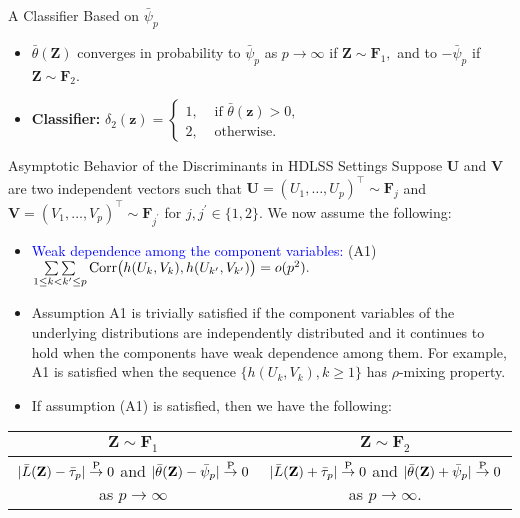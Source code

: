 \documentclass[aspectratio=169, 14pt]{beamer}
\newlength{\colwidth}
\newcommand{\bZ}{\mathbf{Z}}
\newcommand{\bF}{\mathbf{F}}
\newcommand{\bU}{\mathbf{U}}
\newcommand{\bV}{\mathbf{V}}
\newcommand{\bz}{\mathbf{z}}
\newcommand{\0}{\mathbf{0}}
\newcommand{\1}{\mathbf{1}}
\begin{document}
\begin{frame}[t]
\begin{columns}[t]
\begin{column}{\colwidth}
\begin{block}{A Classifier Based on $\bar{\psi}_p$}
\begin{itemize}
\item $\bar{\theta}(\bZ)$ converges in probability to $\bar{\psi}_p$ as $p\to\infty$ if $\bZ\sim\bF_1,$ and to $-\bar{\psi}_p$ if $\bZ\sim\bF_2$.
\item {\bf Classifier:} $\delta_2(\bz)=\begin{cases}
                1,& \text{ if }\bar{\theta}(\bz)>0,\\
                2,& \text{ otherwise.}
               \end{cases}$
\end{itemize}
  \end{block}
\begin{block}{Asymptotic Behavior of the Discriminants in HDLSS Settings}
Suppose $\bU$ and $\bV$ are two independent vectors such that $\bU=(U_1,\ldots, U_p)^\top\sim \bF_j$ and $\bV=(V_1,\ldots, V_p)^\top\sim \bF_{j^\prime}$ for $j,j^\prime\in\{1,2\}$.  We now assume the following:
\begin{itemize}
 \item \textcolor{blue}{Weak dependence among the component variables:} (A1) $\mathop{\sum\sum}\limits_{1\leq k<k^\prime\leq p} {\rm Corr}\big(h(U_k,V_k),h(U_{k^\prime},V_{k^\prime})\big)=o(p^2).$
\item Assumption A1 is trivially satisfied if the component variables of the underlying distributions are independently distributed and it continues to hold when the components have weak dependence among them. For example, A1 is satisfied when the sequence $\{h(U_k,V_k),k\geq 1\}$ has $\rho$-mixing property. %

\item If assumption (A1) is satisfied, then we have the following:
\end{itemize}
\begin{table}[]
    \centering
\renewcommand{\arraystretch}{1.2}
 \begin{tabular}{|c|c|}
\hline
 $\bZ\sim \bF_1$ &$\bZ\sim \bF_2$\\
 \hline
 $|\bar{L}(\bZ)-\bar{\tau}_{p}|\stackrel{\rm P}{\to}0$ and $|\bar{\theta}(\bZ)-\bar{\psi}_{p}|\stackrel{\rm P}{\to}0$ as $p\to\infty$ &
 $|\bar{L}(\bZ)+\bar{\tau}_{p}|\stackrel{\rm P}{\to}0$ and $|\bar{\theta}(\bZ)+\bar{\psi}_{p}|\stackrel{\rm P}{\to}0$ as $p\to\infty$.\\
 \hline
\end{tabular}    
\end{table}


\end{block}
\end{column}
\end{columns}
\end{frame}
\end{document}
